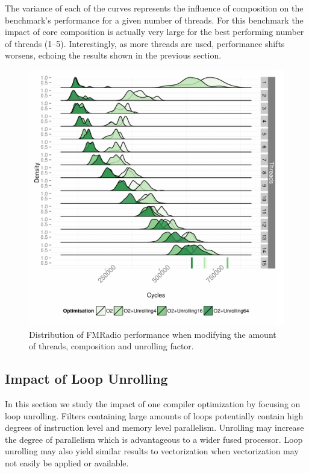 The variance of each of the curves represents the influence of composition on the benchmark's performance for a given number of threads.
For this benchmark the impact of core composition is actually very large for the best performing number of threads (1--5).
Interestingly, as more threads are used,  performance shifts worsens, echoing the results shown in the previous section.

\begin{figure}[t]
  \includegraphics[width=1\textwidth]{streamit-paper/graphics/unrolled_fm.pdf}
  \caption{Distribution of FMRadio performance when modifying the amount of threads, composition and unrolling factor.}\label{fig:fmunroll}
\end{figure}

\subsection{Impact of Loop Unrolling}
In this section we study the impact of one compiler optimization by focusing on loop unrolling.
Filters containing large amounts of loops potentially contain high degrees of instruction level and memory level parallelism.
Unrolling may increase the degree of parallelism which is advantageous to a wider fused processor.
Loop unrolling may also yield similar results to vectorization when vectorization may not easily be applied or available.

